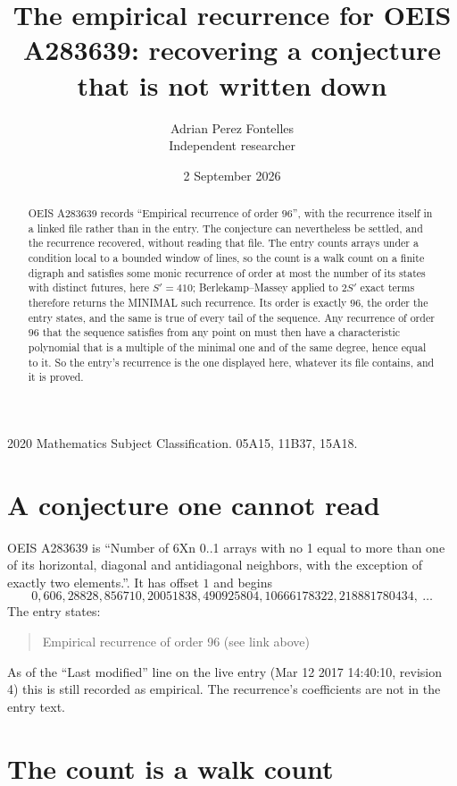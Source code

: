 \documentclass[11pt,a4paper]{article}
\title{The empirical recurrence for OEIS A283639: recovering a conjecture that is not written down}
\author{Adrian Perez Fontelles\\ \small Independent researcher}
\date{2 September 2026}
\theoremstyle{plain}
\theoremstyle{definition}
\begin{document}
\maketitle

\begin{abstract}
OEIS A283639 records ``Empirical recurrence of order $96$'', with the recurrence itself in a
linked file rather than in the entry. The conjecture can nevertheless be settled, and the
recurrence recovered, without reading that file. The entry counts arrays under a condition
local to a bounded window of lines, so the count is a walk count on a finite digraph and
satisfies some monic recurrence of order at most the number of its states with distinct
futures, here $S'=410$; Berlekamp--Massey applied to $2S'$ exact
terms therefore returns the MINIMAL such recurrence. Its order is exactly $96$, the order
the entry states, and the same is true of every tail of the sequence. Any recurrence of order
$96$ that the sequence satisfies from any point on must then have a characteristic
polynomial that is a multiple of the minimal one and of the same degree, hence equal to it. So
the entry's recurrence is the one displayed here, whatever its file contains, and it is
proved.
\end{abstract}

\noindent\small 2020 Mathematics Subject Classification. 05A15, 11B37, 15A18.\normalsize

\section{A conjecture one cannot read}

OEIS A283639 is ``Number of 6Xn 0..1 arrays with no 1 equal to more than one of its horizontal, diagonal and antidiagonal neighbors, with the exception of exactly two elements.''. It has offset $1$ and begins
\[
0, 606, 28828, 856710, 20051838, 490925804, 10666178322, 218881780434,\ \dots
\]
The entry states:
\begin{quote}
Empirical recurrence of order 96 (see link above)
\end{quote}
As of the ``Last modified'' line on the live entry (Mar 12 2017 14:40:10, revision 4) this is still
recorded as empirical. The recurrence's coefficients are not in the entry text.

\section{The count is a walk count}
\end{document}

